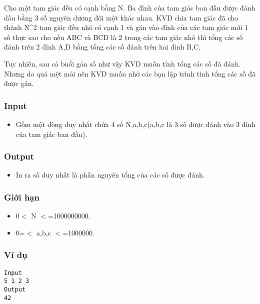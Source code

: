 



   Cho một tam giác đều có cạnh bằng N. Ba đỉnh của tam giác ban đầu được đánh dấu bằng 3 số nguyên dương đôi một khác nhau. KVD chia tam giác đã cho thành N\textasciicircum2 tam giác đều nhỏ có cạnh 1 và gán vào đỉnh của các tam giác mới 1 số thực sao cho nếu ABC và BCD là 2 trong các tam giác nhỏ thì tổng các số đánh trên 2 đỉnh A,D bằng tổng các số đánh trên hai đỉnh B,C.  

   Tuy nhiên, sau cả buổi gán số như vậy KVD muốn tính tổng các số đã đánh. Nhưng do quá mệt mỏi nên KVD muốn nhờ các bạn lập trình tính tổng các số đã được gán.  

\subsubsection{   Input  }
\begin{itemize}
	\item     Gồm một dòng duy nhất chứa 4 số N,a,b,c(a,b,c là 3 số được đánh vào 3 đỉnh của tam giác ban đầu).   
\end{itemize}

\subsubsection{   Output  }
\begin{itemize}
	\item     In ra số duy nhất là phần nguyên tổng của các số được đánh.   
\end{itemize}

\subsubsection{   Giới hạn  }
\begin{itemize}
	\item     0$<$ N $<$=1000000000.   
	\item     0=$<$ a,b,c $<$=1000000.   
\end{itemize}

\subsubsection{   Ví dụ  }
\begin{verbatim}
Input
5 1 2 3
Output
42
\end{verbatim}